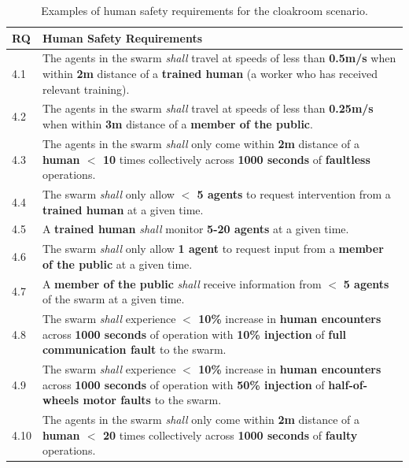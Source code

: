 \documentclass[runningheads]{llncs}
\begin{document}
\begin{table}[!h]
	\centering
	\begin{tabular}{p{6mm} p{116mm}}
		RQ & \textbf{Human Safety Requirements} \\
		\hline
		4.1 & The agents in the swarm \emph{shall} travel at speeds of less than \textbf{0.5m/s} when within \textbf{2m} distance of a \textbf{trained human} (a worker who has received relevant training).
		\\ 
		\hline
		4.2 & The agents in the swarm \emph{shall} travel at speeds of less than \textbf{0.25m/s} when within \textbf{3m} distance of a \textbf{member of the public}.
		\\ 
		\hline
		4.3 & The agents in the swarm \emph{shall} only come within \textbf{2m} distance of a \textbf{human $<$ 10} times collectively across \textbf{1000 seconds} of \textbf{faultless} operations.
		\\ 
		\hline
		4.4 & The swarm \emph{shall} only allow \textbf{$<$ 5 agents} to request intervention from a \textbf{trained human} at a given time.
		\\ 
		\hline
		4.5 & A \textbf{trained human} \emph{shall} monitor \textbf{5-20 agents} at a given time.
		\\ 
		\hline
		4.6 & The swarm \emph{shall} only allow \textbf{1 agent} to request input from a \textbf{member of the public} at a given time.
		\\ 
		\hline
		4.7 & A \textbf{member of the public} \emph{shall} receive  information from $<$ \textbf{5 agents} of the swarm at a given time.
		\\ 
		\hline
		4.8 & The swarm \emph{shall} experience \textbf{$<$ 10\%} increase in \textbf{human encounters} across \textbf{1000 seconds} of operation with \textbf{10\% injection} of \textbf{full communication fault} to the swarm. \\
		\hline
		4.9 & The swarm \emph{shall} experience \textbf{$<$ 10\%} increase in \textbf{human encounters }across \textbf{1000 seconds} of operation with \textbf{50\% injection} of \textbf{half-of-wheels motor faults} to the swarm.\\
		\hline
		4.10 & The agents in the swarm \emph{shall} only come within \textbf{2m} distance of a \textbf{human $<$ 20} times collectively across \textbf{1000 seconds} of \textbf{faulty} operations.
		\\		[1ex] 		
		\hline
	\end{tabular}
	\caption{\label{tab:human-s}Examples of human safety requirements for the cloakroom scenario.}
	\vspace{-4ex}
\end{table}   
\end{document}
